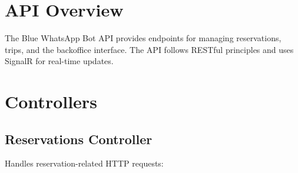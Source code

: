 \section{API Overview}
The Blue WhatsApp Bot API provides endpoints for managing reservations, trips, and the backoffice interface. The API follows RESTful principles and uses SignalR for real-time updates.

\section{Controllers}

\subsection{Reservations Controller}
Handles reservation-related HTTP requests:

